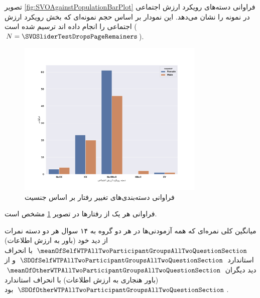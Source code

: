 تصویر \ref{fig:SVOAgainstPopulationBarPlot}
فراوانی دسته‌های رویکرد ارزش اجتماعی در نمونه را نشان می‌دهد. این نمودار بر اساس حجم نمونه‌ای که 
بخش رویکرد ارزش اجتماعی را انجام داده اند ترسیم شده است
($N=\SVOSliderTestDropsPageRemainers$).

\begin{figure}[htpb]
    \centering
    \includegraphics[width=0.8\textwidth]{./img/FrequencyBehaviorPhoneNumber.png}
    \caption{فراوانی دسته‌بندی‌های تغییر رفتار بر اساس جنسیت}
    \label{fig:FrequencyBehaviorPhoneNumber}
\end{figure}

فراوانی هر یک از رفتارها در
تصویر \ref{fig:FrequencyBehaviorPhoneNumber}
مشخص است.



میانگین کلی نمره‌ای که همه آزمودنی‌ها در هر دو گروه به ۱۴ سوال هر دو دسته
نمرات از دید خود
\!(باور به ارزش اطلاعات)
$\meanOfSelfWTPAllTwoParticipantGroupsAllTwoQuestionSection$
با انحراف استاندارد
$\SDOfSelfWTPAllTwoParticipantGroupsAllTwoQuestionSection$
و از دید دیگران
$\meanOfOtherWTPAllTwoParticipantGroupsAllTwoQuestionSection$
\!(باور هنجاری به ارزش اطلاعات)
با انحراف استاندارد
$\SDOfOtherWTPAllTwoParticipantGroupsAllTwoQuestionSection$
بود.

